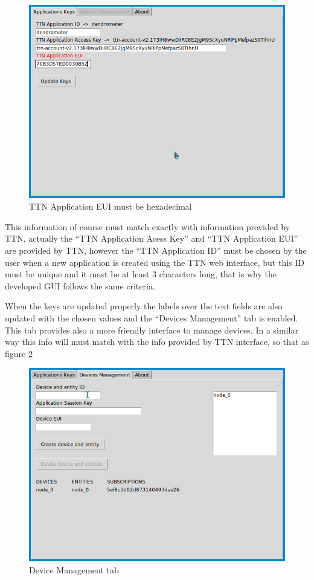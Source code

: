 \documentclass[11pt,a4paper,dvipsnames,twoside]{article}
\begin{document}
\begin{figure}[ht]
  \centering
  \includegraphics[width=.9\textwidth]{../pictures/GUI_app_keys_fail.png}
  \caption{TTN Application EUI must be hexadecimal} 
  \label{fig:GUI_app_keys_fail}
\end{figure}

This information of course must match exactly with information provided by TTN, actually the \enquote{TTN Application Acess Key} and \enquote{TTN Application EUI} are provided by TTN, however the \enquote{TTN Application ID} must be chosen by the user when a new application is created using the TTN web interface, but this ID must be unique and it must be at least 3 characters long, that is why the developed GUI follows the same criteria.

When the keys are updated properly the labels over the text fields are also updated with the chosen values and the \enquote{Devices Management} tab is enabled. This tab provides also a more friendly interface to manage devices. In a similar way this info will must match with the info provided by TTN interface, so that as figure \ref{fig:device_management_tab}

\begin{figure}[ht]
  \centering
  \includegraphics[width=.9\textwidth]{../pictures/GUI_device_management.png}
  \caption{Device Management tab}
  \label{fig:device_management_tab}
\end{figure}
\end{document}
